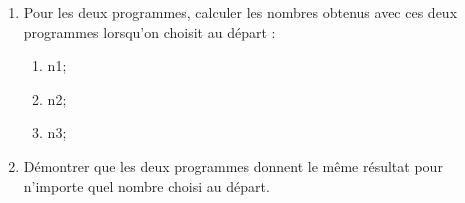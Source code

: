 \documentclass[exercice]{thedocument}%
\begin{document}
%
\begin{enumerate}
    \item Pour les deux programmes, calculer les nombres obtenus avec ces deux
    programmes lorsqu'on choisit au départ :
    \begin{enumerate}
        \item \<n1;
        \item \<n2;
        \item \<n3;
    \end{enumerate}
    \item Démontrer que les deux programmes donnent le même résultat pour
    n'importe quel nombre choisi au départ.
\end{enumerate}
\end{document}
